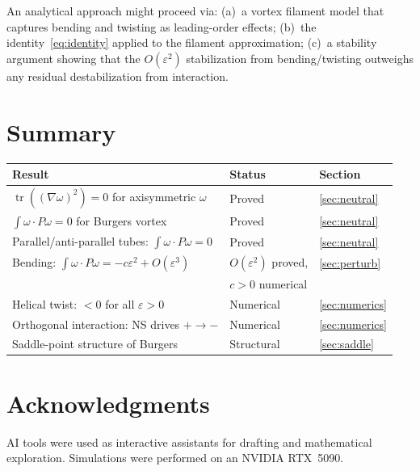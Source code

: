 \documentclass[11pt,a4paper]{article}
\theoremstyle{plain}
\theoremstyle{definition}
\theoremstyle{remark}
\DeclareMathOperator{\tr}{tr}
\begin{document}
An analytical approach might proceed via:
(a)~a vortex filament model that captures bending
and twisting as leading-order effects;
(b)~the identity~\eqref{eq:identity} applied to
the filament approximation;
(c)~a stability argument showing that the
$O(\varepsilon^2)$ stabilization from bending/twisting
outweighs any residual destabilization from
interaction.

\section{Summary}\label{sec:summary}

\begin{center}
\renewcommand{\arraystretch}{1.2}
\begin{tabular}{@{}lll@{}}
\toprule
\textbf{Result} & \textbf{Status} & \textbf{Section} \\
\midrule
$\tr((\nabla\omega)^2)=0$ for axisymmetric $\omega$
  & Proved & \ref{sec:neutral} \\
$\int\omega\cdot P\omega=0$ for Burgers vortex
  & Proved & \ref{sec:neutral} \\
Parallel/anti-parallel tubes: $\int\omega\cdot P\omega=0$
  & Proved & \ref{sec:neutral} \\
Bending: $\int\omega\cdot P\omega = -c\varepsilon^2+O(\varepsilon^3)$
  & $O(\varepsilon^2)$ proved, & \ref{sec:perturb} \\
  & $c>0$ numerical & \\
Helical twist: $<0$ for all $\varepsilon>0$
  & Numerical & \ref{sec:numerics} \\
Orthogonal interaction: NS drives $+\to -$
  & Numerical & \ref{sec:numerics} \\
Saddle-point structure of Burgers
  & Structural & \ref{sec:saddle} \\
\bottomrule
\end{tabular}
\end{center}


\section*{Acknowledgments}

AI tools were used as interactive assistants for
drafting and mathematical exploration.
Simulations were performed on an NVIDIA RTX~5090.
\end{document}
